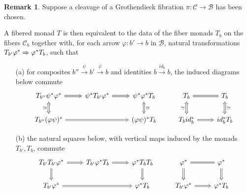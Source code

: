 \documentclass[a4paper,10pt
]{article}%
\numberwithin{equation}{section}
\numberwithin{figure}{section}
\theoremstyle{definition} %
\newtheorem{remark}[equation]{Remark}%
\newcommand{\1}{\ensuremath{\mathbbm 1}}%
\begin{document}
\begin{remark}\label{FIBMONCL REM}
	Suppose a cleavage of a Grothendieck fibration
	$\pi \colon \mathcal{C} \to \mathcal{B}$ 
	has been chosen.
	
	A fibered monad $T$ is then equivalent to the data of the fiber monads 
	$T_b$ on the fibers $\mathcal{C}_b$ together with,
	for each arrow $\varphi \colon b' \to b$ in $\mathcal{B}$,
	natural transformations
	$T_{b'} \varphi^{\**} \Rightarrow \varphi^{\**} T_{b}$,
	such that
	\begin{itemize}
		\item[(a)]
		for composites $b'' \xrightarrow{\psi} b' \xrightarrow{\varphi} b$
		and identities $b \xrightarrow{id_b} b$,
		the induced diagrams below commute
		\begin{equation}\label{GROTHASS EQ}
		\begin{tikzcd}
		T_{b''} \psi^{\**} \varphi^{\**} 
		\ar[Rightarrow]{r} \ar[Leftrightarrow]{d}[swap]{\simeq} &
		\psi^{\**} T_{b'} \varphi^{\**} \ar[Rightarrow]{r} &
		\psi^{\**} \varphi^{\**}  T_{b} \ar[Leftrightarrow]{d}{\simeq} &
		T_b \ar[equal]{r} \ar[Leftrightarrow]{d}[swap]{\simeq} &
		T_b \ar[Leftrightarrow]{d}{\simeq}
		\\
		T_{b''} (\varphi \psi)^{\**} \ar[Rightarrow]{rr}{} &&
		(\varphi \psi)^{\**} T_{b} &
		T_b id_b^{\**} \ar[Rightarrow]{r}{} &
		id_b^{\**} T_{b}
		\end{tikzcd}
		\end{equation}
		\item[(b)] the natural squares below,
		with vertical maps induced by the monads $T_{b'},T_b$, commute 
		\begin{equation}\label{GROTHCART EQ}
		\begin{tikzcd}
		T_{b'} T_{b'} \varphi^{\**} \ar[Rightarrow]{r} \ar[Rightarrow]{d}[swap]{} &
		T_{b'} \varphi^{\**} T_{b} \ar[Rightarrow]{r} &
		\varphi^{\**} T_{b} T_{b} \ar[Rightarrow]{d}{} &
		\varphi^{\**} \ar[equal]{r} \ar[Rightarrow]{d}&
		\varphi^{\**} \ar[Rightarrow]{d}
		\\
		T_{b'} \varphi^{\**} \ar[Rightarrow]{rr}{} &&
		\varphi^{\**} T_{b} &
		T_{b'} \varphi^{\**} \ar[Rightarrow]{r}{} &
		\varphi^{\**} T_{b}
		\end{tikzcd}
		\end{equation}
	\end{itemize}
\end{remark}
\end{document}
